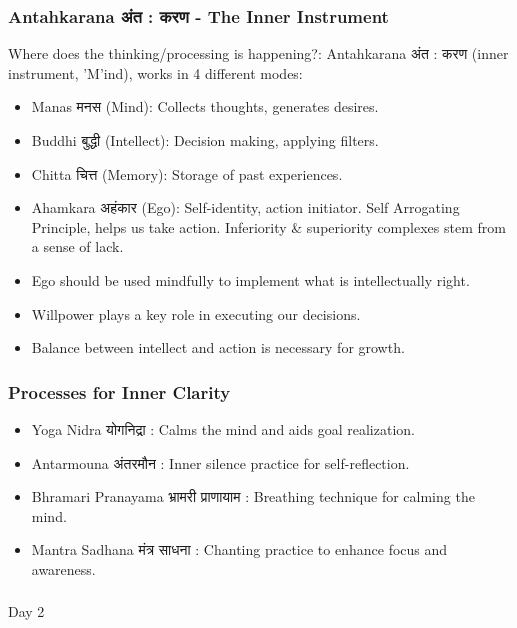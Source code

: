\begin{frame}[fragile]\frametitle{Antahkarana अंत : करण - The Inner Instrument}

Where does the thinking/processing is happening?: Antahkarana अंत : करण (inner instrument, 'M'ind), works in 4 different modes:
      \begin{itemize}
        \item Manas मनस (Mind): Collects thoughts, generates desires.
        \item Buddhi बुद्धी (Intellect): Decision making, applying filters.
        \item Chitta चित्त (Memory): Storage of past experiences.
        \item Ahamkara अहंकार (Ego): Self-identity, action initiator. Self Arrogating Principle, helps us take action. Inferiority \& superiority complexes stem from a sense of lack. 
        \item Ego should be used mindfully to implement what is intellectually right.
        \item Willpower plays a key role in executing our decisions.
        \item Balance between intellect and action is necessary for growth.
      \end{itemize}
\end{frame}

\begin{frame}[fragile]\frametitle{Processes for Inner Clarity}
      \begin{itemize}
        \item Yoga Nidra योगनिद्रा : Calms the mind and aids goal realization.
        \item Antarmouna अंतरमौन : Inner silence practice for self-reflection.
        \item Bhramari Pranayama भ्रामरी प्राणायाम : Breathing technique for calming the mind.
        \item Mantra Sadhana मंत्र साधना : Chanting practice to enhance focus and awareness.
      \end{itemize}
\end{frame}

\begin{frame}[fragile]\frametitle{}
\begin{center}
{\Large Day 2}
\end{center}
\end{frame}
